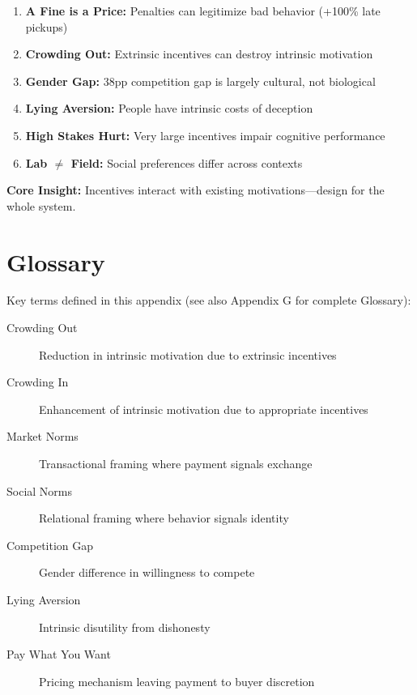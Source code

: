 \begin{tcolorbox}[colback=gray!10!white,colframe=gray!50!black,title=Key Takeaways]
\begin{enumerate}
    \item \textbf{A Fine is a Price:} Penalties can legitimize bad behavior (+100\% late pickups)
    \item \textbf{Crowding Out:} Extrinsic incentives can destroy intrinsic motivation
    \item \textbf{Gender Gap:} 38pp competition gap is largely cultural, not biological
    \item \textbf{Lying Aversion:} People have intrinsic costs of deception
    \item \textbf{High Stakes Hurt:} Very large incentives impair cognitive performance
    \item \textbf{Lab $\neq$ Field:} Social preferences differ across contexts
\end{enumerate}

\textbf{Core Insight:} Incentives interact with existing motivations---design for the whole system.
\end{tcolorbox}

\section{Glossary}

Key terms defined in this appendix (see also Appendix G for complete Glossary):

\begin{description}
    \item[Crowding Out] Reduction in intrinsic motivation due to extrinsic incentives
    \item[Crowding In] Enhancement of intrinsic motivation due to appropriate incentives
    \item[Market Norms] Transactional framing where payment signals exchange
    \item[Social Norms] Relational framing where behavior signals identity
    \item[Competition Gap] Gender difference in willingness to compete
    \item[Lying Aversion] Intrinsic disutility from dishonesty
    \item[Pay What You Want] Pricing mechanism leaving payment to buyer discretion
\end{description}

